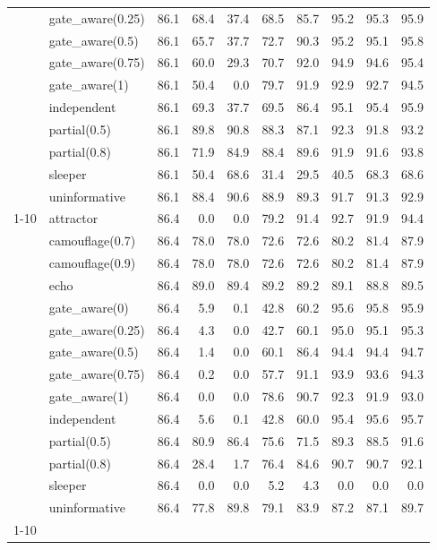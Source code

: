 \begin{tabular}{llrrrrrrrr}
 & gate\_aware(0.25) & 86.1 & 68.4 & 37.4 & 68.5 & 85.7 & 95.2 & 95.3 & 95.9 \\
 & gate\_aware(0.5) & 86.1 & 65.7 & 37.7 & 72.7 & 90.3 & 95.2 & 95.1 & 95.8 \\
 & gate\_aware(0.75) & 86.1 & 60.0 & 29.3 & 70.7 & 92.0 & 94.9 & 94.6 & 95.4 \\
 & gate\_aware(1) & 86.1 & 50.4 & 0.0 & 79.7 & 91.9 & 92.9 & 92.7 & 94.5 \\
 & independent & 86.1 & 69.3 & 37.7 & 69.5 & 86.4 & 95.1 & 95.4 & 95.9 \\
 & partial(0.5) & 86.1 & 89.8 & 90.8 & 88.3 & 87.1 & 92.3 & 91.8 & 93.2 \\
 & partial(0.8) & 86.1 & 71.9 & 84.9 & 88.4 & 89.6 & 91.9 & 91.6 & 93.8 \\
 & sleeper & 86.1 & 50.4 & 68.6 & 31.4 & 29.5 & 40.5 & 68.3 & 68.6 \\
 & uninformative & 86.1 & 88.4 & 90.6 & 88.9 & 89.3 & 91.7 & 91.3 & 92.9 \\
\cline{1-10}
\multirow[t]{14}{*}{0.700000} & attractor & 86.4 & 0.0 & 0.0 & 79.2 & 91.4 & 92.7 & 91.9 & 94.4 \\
 & camouflage(0.7) & 86.4 & 78.0 & 78.0 & 72.6 & 72.6 & 80.2 & 81.4 & 87.9 \\
 & camouflage(0.9) & 86.4 & 78.0 & 78.0 & 72.6 & 72.6 & 80.2 & 81.4 & 87.9 \\
 & echo & 86.4 & 89.0 & 89.4 & 89.2 & 89.2 & 89.1 & 88.8 & 89.5 \\
 & gate\_aware(0) & 86.4 & 5.9 & 0.1 & 42.8 & 60.2 & 95.6 & 95.8 & 95.9 \\
 & gate\_aware(0.25) & 86.4 & 4.3 & 0.0 & 42.7 & 60.1 & 95.0 & 95.1 & 95.3 \\
 & gate\_aware(0.5) & 86.4 & 1.4 & 0.0 & 60.1 & 86.4 & 94.4 & 94.4 & 94.7 \\
 & gate\_aware(0.75) & 86.4 & 0.2 & 0.0 & 57.7 & 91.1 & 93.9 & 93.6 & 94.3 \\
 & gate\_aware(1) & 86.4 & 0.0 & 0.0 & 78.6 & 90.7 & 92.3 & 91.9 & 93.0 \\
 & independent & 86.4 & 5.6 & 0.1 & 42.8 & 60.0 & 95.4 & 95.6 & 95.7 \\
 & partial(0.5) & 86.4 & 80.9 & 86.4 & 75.6 & 71.5 & 89.3 & 88.5 & 91.6 \\
 & partial(0.8) & 86.4 & 28.4 & 1.7 & 76.4 & 84.6 & 90.7 & 90.7 & 92.1 \\
 & sleeper & 86.4 & 0.0 & 0.0 & 5.2 & 4.3 & 0.0 & 0.0 & 0.0 \\
 & uninformative & 86.4 & 77.8 & 89.8 & 79.1 & 83.9 & 87.2 & 87.1 & 89.7 \\
\cline{1-10}
\bottomrule
\end{tabular}
